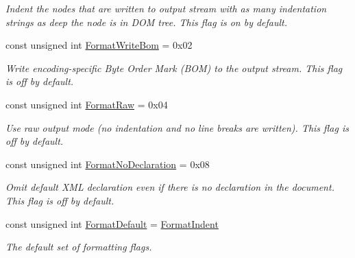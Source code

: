 \begin{DoxyCompactItemize}
\begin{DoxyCompactList}\small\item\em Indent the nodes that are written to output stream with as many indentation strings as deep the node is in DOM tree. This flag is on by default. \item\end{DoxyCompactList}\item 
\hypertarget{namespacephys_1_1xml_a76a253f60deb94ef39c255064afb6040}{
const unsigned int \hyperlink{namespacephys_1_1xml_a76a253f60deb94ef39c255064afb6040}{FormatWriteBom} = 0x02}
\label{d9/d27/namespacephys_1_1xml_a76a253f60deb94ef39c255064afb6040}

\begin{DoxyCompactList}\small\item\em Write encoding-\/specific Byte Order Mark (BOM) to the output stream. This flag is off by default. \item\end{DoxyCompactList}\item 
\hypertarget{namespacephys_1_1xml_a6f6696cbdc48011817adad7978e83976}{
const unsigned int \hyperlink{namespacephys_1_1xml_a6f6696cbdc48011817adad7978e83976}{FormatRaw} = 0x04}
\label{d9/d27/namespacephys_1_1xml_a6f6696cbdc48011817adad7978e83976}

\begin{DoxyCompactList}\small\item\em Use raw output mode (no indentation and no line breaks are written). This flag is off by default. \item\end{DoxyCompactList}\item 
\hypertarget{namespacephys_1_1xml_aee4ccb3535945d4808a0cf6abe4cb050}{
const unsigned int \hyperlink{namespacephys_1_1xml_aee4ccb3535945d4808a0cf6abe4cb050}{FormatNoDeclaration} = 0x08}
\label{d9/d27/namespacephys_1_1xml_aee4ccb3535945d4808a0cf6abe4cb050}

\begin{DoxyCompactList}\small\item\em Omit default XML declaration even if there is no declaration in the document. This flag is off by default. \item\end{DoxyCompactList}\item 
const unsigned int \hyperlink{namespacephys_1_1xml_a08bf6aab51f79929d9097706a5e64408}{FormatDefault} = \hyperlink{namespacephys_1_1xml_afaad0b8f59b5f103218ed5cb39b1bbde}{FormatIndent}
\begin{DoxyCompactList}\small\item\em The default set of formatting flags. \item\end{DoxyCompactList}\end{DoxyCompactItemize}


